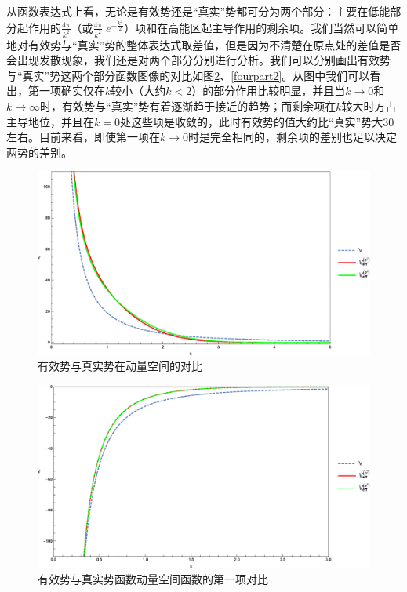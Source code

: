 \documentclass[cs4size,titlepage,twoside]{ctexart}
\begin{document}
从函数表达式上看，无论是有效势还是“真实”势都可分为两个部分：主要在低能部分起作用的$\displaystyle\frac{4 \pi }{k^2}$（或$\displaystyle\frac{4 \pi }{k^2}\; e^{-\frac{k^2}{2}}$）项和在高能区起主导作用的剩余项。我们当然可以简单地对有效势与“真实”势的整体表达式取差值，但是因为不清楚在原点处的差值是否会出现发散现象，我们还是对两个部分分别进行分析。我们可以分别画出有效势与“真实”势这两个部分函数图像的对比如图\ref{fourpart1}、\ref{fourpart2}。从图中我们可以看出，第一项确实仅在$k$较小（大约$k<2$）的部分作用比较明显，并且当$k\rightarrow0$和$k\rightarrow\infty$时，有效势与“真实”势有着逐渐趋于接近的趋势；而剩余项在$k$较大时方占主导地位，并且在$k=0$处这些项是收敛的，此时有效势的值大约比“真实”势大30左右。目前来看，即使第一项在$k\rightarrow0$时是完全相同的，剩余项的差别也足以决定两势的差别。
\begin{figure}[!hbp]
	\centering
	\includegraphics[width=6in]{FourierTransformation_1.eps}
	\caption{有效势与真实势在动量空间的对比}\label{TotalFourier}
\end{figure}
\begin{figure}[!bp]
	\centering
	\includegraphics[width=6in]{FourierTransformation_2.eps}
	\caption{有效势与真实势函数动量空间函数的第一项对比}\label{fourpart1}
\end{figure}
\end{document}
